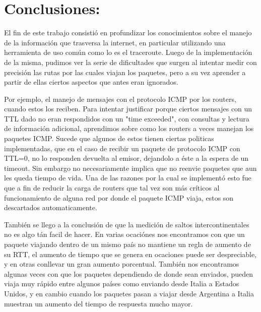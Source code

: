\documentclass[a4paper,10pt]{article}
\begin{document}
\section{Conclusiones:}
\medskip
\par{El fin de este trabajo consistió en profundizar los conocimientos sobre el manejo de la información que trasversa la internet, en particular utilizando una herramienta de uso común como lo es el traceroute. Luego de la implementación de la misma, pudimos ver la serie de dificultades que surgen al intentar medir con precisión las rutas por las cuales viajan los paquetes, pero a su vez aprender a partir de ellas ciertos aspectos que antes eran ignorados.}
\par{Por ejemplo, el manejo de mensajes con el protocolo ICMP por los routers, cuando estos los reciben. Para intentar justificar porque ciertos mensajes con un TTL dado no eran respondidos con un "time exceeded", con consultas y lectura de información adicional, aprendimos sobre como los routers a veces manejan los paquetes ICMP. Sucede que algunos de estos tienen ciertas politicas implementadas, que en el caso de recibir un paquete de protocolo ICMP con TTL=0, no lo responden devuelta al emisor, dejandolo a éste a la espera de un timeout. Sin embargo no necesariamente implica que no reenvie paquetes que aun les queda tiempo de vida. Una de las razones por la cual se implementó esto fue que a fin de reducir la carga de routers que tal vez son más críticos al funcionamiento de alguna red por donde el paquete ICMP viaja, estos son descartados automaticamente. }
\par{También se llego a la conclusión de que la medición de saltos intercontinentales no es algo tán facil de hacer. En varias ocaciónes nos encontramos con que un paquete viajando dentro de un mismo país no mantiene un regla de aumento de su RTT, el aumento de tiempo que se genera en ocaciones puede ser despreciable, y en otras conllevar un gran aumento porcentual. También nos encontramos algunas veces con que los paquetes dependiendo de donde sean enviados, pueden viaja muy rápido entre algunos países como enviando desde Italia a Estados Unidos, y en cambio cuando los paquetes pasan a viajar desde Argentina a Italia muestran un aumento del tiempo de respuesta mucho mayor.}
\end{document}
